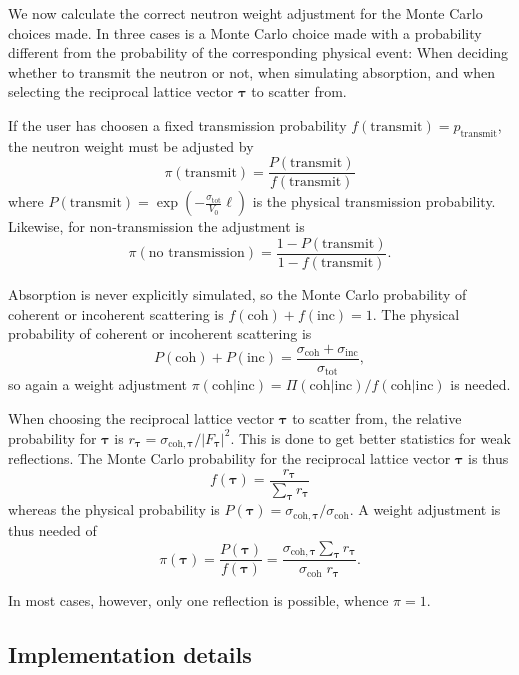 We now calculate the correct neutron weight adjustment for the Monte
Carlo choices made. In three cases is a Monte Carlo choice made with a
probability different from the probability of the corresponding physical
event: When deciding whether to transmit the neutron or not, when
simulating absorption, and when selecting the reciprocal lattice vector
$\boldsymbol{\tau}$ to scatter from.

If the user has choosen a fixed transmission probability $f(\textrm{
  transmit}) = p_\textrm{transmit}$, the neutron weight must be adjusted by
$$ \pi(\textrm{transmit}) = \frac{P(\textrm{transmit})}{f(\textrm{transmit})}
$$
where $P(\textrm{transmit}) = \exp(-\frac{\sigma_\textrm{tot}}{V_0}\ell)$ is
the physical transmission probability. Likewise, for non-transmission
the adjustment is
$$ \pi(\textrm{no~transmission}) = \frac{1-P(\textrm{transmit})}{1-f(\textrm{transmit})}.
$$

Absorption is never explicitly simulated, so the Monte Carlo probability
of coherent or incoherent scattering is
$f(\textrm{coh})+f(\textrm{inc}) = 1$.
The physical probability of coherent or incoherent scattering is
$$ P(\textrm{coh})+P(\textrm{inc}) = \frac{\sigma_\textrm{coh} + \sigma_\textrm{
    inc}}{\sigma_\textrm{tot}}, $$
so again a weight adjustment $\pi(\textrm{coh}|\textrm{inc}) = \Pi(\textrm{
    coh}|\textrm{inc})/f(\textrm{coh}|\textrm{inc})$ is needed.

When choosing the reciprocal lattice vector $\boldsymbol{\tau}$ to
scatter from, the relative probability for $\boldsymbol{\tau}$ is
$r_{\boldsymbol{\tau}} = \sigma_{\textrm{
    coh},\boldsymbol{\tau}}/|F_{\boldsymbol{\tau}}|^2$. This is done to
get better statistics for weak reflections. The Monte Carlo probability
for the reciprocal lattice vector $\boldsymbol{\tau}$ is thus
$$ f(\boldsymbol{\tau}) =
\frac{r_{\boldsymbol{\tau}}}{\sum_{\boldsymbol{\tau}} r_{\boldsymbol{\tau}}}
$$
whereas the physical probability is $P(\boldsymbol{\tau}) = \sigma_{\textrm{
    coh},\boldsymbol{\tau}}/\sigma_\textrm{coh}$. A weight adjustment is
thus needed of
$$
\pi(\boldsymbol{\tau}) =
 \frac{P(\boldsymbol{\tau})}{f(\boldsymbol{\tau})} =
 \frac{\sigma_{\textrm{coh},\boldsymbol{\tau}}
  \sum_{\boldsymbol{\tau}} r_{\boldsymbol{\tau}}}
 {\sigma_\textrm{coh} \; r_{\boldsymbol{\tau}}}.$$

In most cases, however, only one reflection is possible, whence $\pi=1$.

\subsection{Implementation details}
\label{s:Single_crystal_implement}

